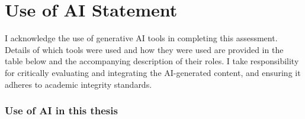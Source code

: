 \chapter*{Use of AI Statement}


I acknowledge the use of generative AI tools in completing this assessment.
Details of which tools were used and how they were used are provided in the
table below and the accompanying description of their roles. I take
responsibility for critically evaluating and integrating the AI-generated
content, and ensuring it adheres to academic integrity standards.

\subsection*{Use of AI in this thesis}

